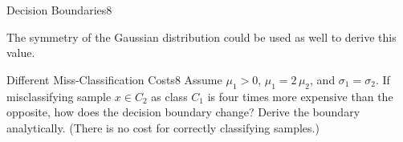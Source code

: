 \begin{questions}
\begin{question}{Decision Boundaries}{8}
\begin{answer}
	The symmetry of the Gaussian distribution could be used as well to derive this value.
\end{answer}

\end{question}


\begin{question}{Different Miss-Classification Costs}{8}
Assume $\mu_1 > 0$, $\mu_1 = 2\, \mu_2$, and $\sigma_1=\sigma_2$. If misclassifying sample $x \in C_2$ as class $C_1$ is four times more expensive than the opposite, how does the decision boundary change? Derive the boundary analytically.
(There is no cost for correctly classifying samples.)

\begin{answer}

\end{answer}

\end{question}


\end{questions}
